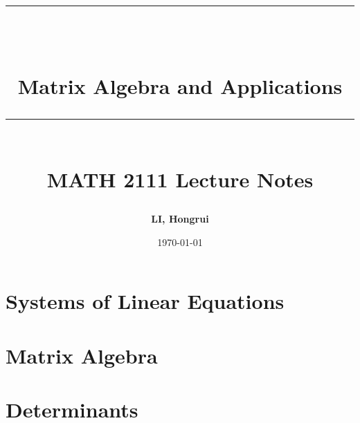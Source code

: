 \documentclass[10pt, a4paper]{article}
\newcommand{\HRule}[1]{\rule{\linewidth}{#1}}
\begin{document}
\title{ \normalsize \textsc{}
\\ [2.0cm]
\HRule{1.5pt} \\ [0.3cm]
\LARGE {\textbf{Matrix Algebra and Applications}
\HRule{1.5pt} \\ [0.6cm]
\LARGE{\textbf{MATH 2111 Lecture Notes}} \vspace*{10\baselineskip}}
}
\date{\today}
\author{\textbf{LI, Hongrui}}  %
\maketitle

\clearpage
\tableofcontents
\newpage


\section{Systems of Linear Equations}
\section{Matrix Algebra}
\newpage



\section{Determinants}
\end{document}
